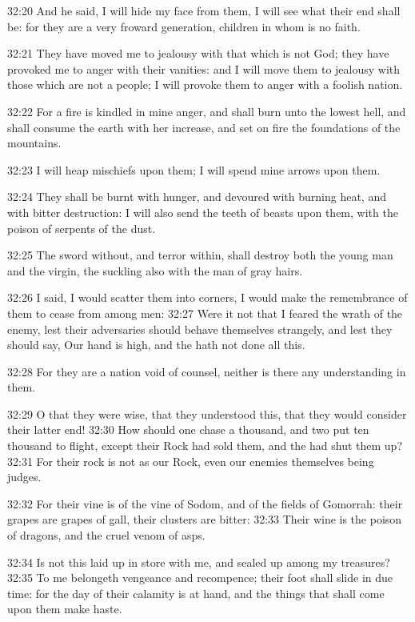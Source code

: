 32:20 And he said, I will hide my face from them, I will see what
their end shall be: for they are a very froward generation, children
in whom is no faith.

32:21 They have moved me to jealousy with that which is not God; they
have provoked me to anger with their vanities: and I will move them to
jealousy with those which are not a people; I will provoke them to
anger with a foolish nation.

32:22 For a fire is kindled in mine anger, and shall burn unto the
lowest hell, and shall consume the earth with her increase, and set on
fire the foundations of the mountains.

32:23 I will heap mischiefs upon them; I will spend mine arrows upon
them.

32:24 They shall be burnt with hunger, and devoured with burning heat,
and with bitter destruction: I will also send the teeth of beasts upon
them, with the poison of serpents of the dust.

32:25 The sword without, and terror within, shall destroy both the
young man and the virgin, the suckling also with the man of gray
hairs.

32:26 I said, I would scatter them into corners, I would make the
remembrance of them to cease from among men: 32:27 Were it not that I
feared the wrath of the enemy, lest their adversaries should behave
themselves strangely, and lest they should say, Our hand is high, and
the \LORD hath not done all this.

32:28 For they are a nation void of counsel, neither is there any
understanding in them.

32:29 O that they were wise, that they understood this, that they
would consider their latter end!  32:30 How should one chase a
thousand, and two put ten thousand to flight, except their Rock had
sold them, and the \LORD had shut them up?  32:31 For their rock is not
as our Rock, even our enemies themselves being judges.

32:32 For their vine is of the vine of Sodom, and of the fields of
Gomorrah: their grapes are grapes of gall, their clusters are bitter:
32:33 Their wine is the poison of dragons, and the cruel venom of
asps.

32:34 Is not this laid up in store with me, and sealed up among my
treasures?  32:35 To me belongeth vengeance and recompence; their foot
shall slide in due time: for the day of their calamity is at hand, and
the things that shall come upon them make haste.

